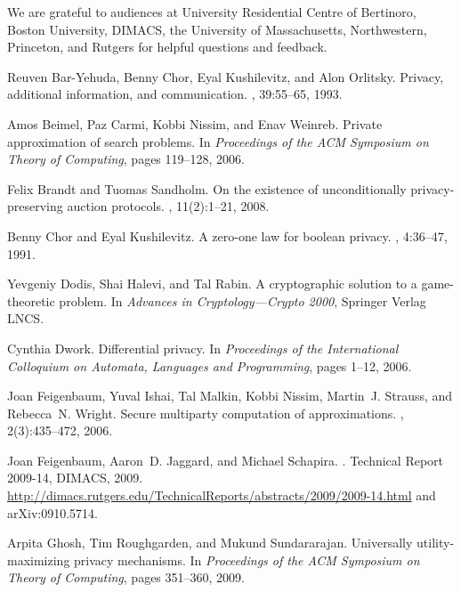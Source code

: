 \documentclass{article}
\theoremstyle{theorem}
\theoremstyle{definition}
\theoremstyle{remark}
\begin{document}
We are grateful to audiences at University Residential Centre of Bertinoro, Boston University, DIMACS, the University of Massach\-usetts, Northwestern, Princeton, and Rutgers for helpful questions and feedback.


\begin{thebibliography}{10}

Reuven Bar-Yehuda, Benny Chor, Eyal Kushilevitz, and Alon Orlitsky.
\newblock Privacy, additional information, and communication.
, 39:55--65, 1993.

Amos Beimel, Paz Carmi, Kobbi Nissim, and Enav Weinreb.
\newblock Private approximation of search problems.
\newblock In {\em Proceedings of the ACM Symposium on Theory of Computing},
  pages 119--128, 2006.

Felix Brandt and Tuomas Sandholm.
\newblock On the existence of unconditionally privacy-preserving auction
  protocols.
, 11(2):1--21, 2008.

Benny Chor and Eyal Kushilevitz.
\newblock A zero-one law for boolean privacy.
, 4:36--47, 1991.

Yevgeniy Dodis, Shai Halevi, and Tal Rabin.
\newblock A cryptographic solution to a game-theoretic problem.
\newblock In {\em Advances in Cryptology---Crypto 2000}, Springer Verlag LNCS.

Cynthia Dwork.
\newblock Differential privacy.
\newblock In {\em Proceedings of the International Colloquium on Automata,
  Languages and Programming}, pages 1--12, 2006.

Joan Feigenbaum, Yuval Ishai, Tal Malkin, Kobbi Nissim, Martin~J. Strauss, and
  Rebecca~N. Wright.
\newblock Secure multiparty computation of approximations.
, 2(3):435--472, 2006.

Joan Feigenbaum, Aaron~D. Jaggard, and Michael Schapira.
.
\newblock Technical Report 2009-14, DIMACS, 2009.
\newblock
  \url{http://dimacs.rutgers.edu/TechnicalReports/abstracts/2009/2009-14.html}
  and arXiv:0910.5714.

Arpita Ghosh, Tim Roughgarden, and Mukund Sundararajan.
\newblock Universally utility-maximizing privacy mechanisms.
\newblock In {\em Proceedings of the ACM Symposium on Theory of Computing},
  pages 351--360, 2009.


\end{thebibliography}
\end{document}
